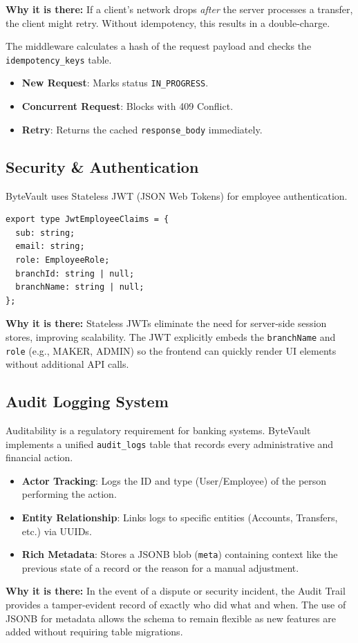 \textbf{Why it is there:} If a client's network drops \textit{after} the server processes a transfer, the client might retry. Without idempotency, this results in a double-charge.

The middleware calculates a hash of the request payload and checks the \texttt{idempotency\_keys} table. 
\begin{itemize}
    \item \textbf{New Request}: Marks status \texttt{IN\_PROGRESS}.
    \item \textbf{Concurrent Request}: Blocks with 409 Conflict.
    \item \textbf{Retry}: Returns the cached \texttt{response\_body} immediately.
\end{itemize}

\subsection{Security \& Authentication}
ByteVault uses Stateless JWT (JSON Web Tokens) for employee authentication. 

\begin{lstlisting}[style=typescript]
export type JwtEmployeeClaims = {
  sub: string;
  email: string;
  role: EmployeeRole;
  branchId: string | null;
  branchName: string | null;
};
\end{lstlisting}

\textbf{Why it is there:} Stateless JWTs eliminate the need for server-side session stores, improving scalability. The JWT explicitly embeds the \texttt{branchName} and \texttt{role} (e.g., MAKER, ADMIN) so the frontend can quickly render UI elements without additional API calls.
\subsection{Audit Logging System}
Auditability is a regulatory requirement for banking systems. ByteVault implements a unified \texttt{audit\_logs} table that records every administrative and financial action.

\begin{itemize}
    \item \textbf{Actor Tracking}: Logs the ID and type (User/Employee) of the person performing the action.
    \item \textbf{Entity Relationship}: Links logs to specific entities (Accounts, Transfers, etc.) via UUIDs.
    \item \textbf{Rich Metadata}: Stores a JSONB blob (\texttt{meta}) containing context like the previous state of a record or the reason for a manual adjustment.
\end{itemize}

\textbf{Why it is there:} In the event of a dispute or security incident, the Audit Trail provides a tamper-evident record of exactly who did what and when. The use of JSONB for metadata allows the schema to remain flexible as new features are added without requiring table migrations.
